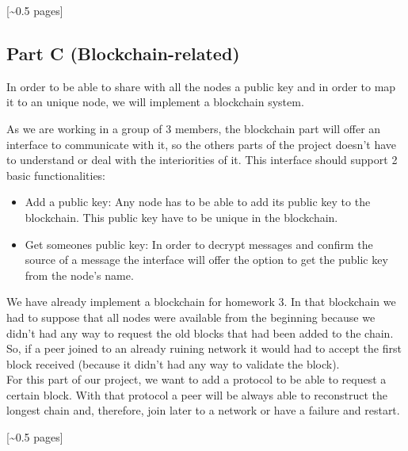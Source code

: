 \documentclass[12pt,a4paper,draft]{article}
\begin{document}
[\textasciitilde{}0.5 pages]

\subsection{Part C (Blockchain-related)}

In order to be able to share with all the nodes a public key and in order to map it to an unique node, we will implement a blockchain system. 

As we are working in a group of 3 members, the blockchain part will offer an interface to communicate with it, so the others parts of the project doesn't have to understand or deal with the interiorities of it. This interface should support 2 basic functionalities:

\begin{itemize}
 \item Add a public key: Any node has to be able to add its public key to the blockchain. This public key have to be unique in the blockchain.

 \item Get someones public key: In order to decrypt messages and confirm the source of a message the interface will offer the option to get the public key from the node's name.
\end{itemize}

We have already implement a blockchain for homework 3. In that blockchain we had to suppose that all nodes were available from the beginning because we didn't had any way to request the old blocks that had been added to the chain. 
So, if a peer joined to an already ruining network it would had to accept the first block received (because it didn't had any way to validate the block). \\


For this part of our project, we want to add a protocol to be able to request a certain block. With that protocol a peer will be always able to reconstruct the longest chain and, therefore, join later to a network or have a failure and restart.

[\textasciitilde{}0.5 pages]
\end{document}
